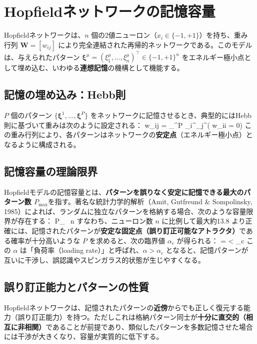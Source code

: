\section{Hopfieldネットワークの記憶容量}
Hopfieldネットワークは、$n$ 個の2値ニューロン（$x_i \in \{-1, +1\}$）を持ち、重み行列 $\mathbf{W} = [w_{ij}]$ により完全連結された再帰的ネットワークである。このモデルは、与えられたパターン $\boldsymbol{\xi}^\mu = (\xi_1^\mu, \ldots, \xi_n^\mu)^\top \in \{-1, +1\}^n$ をエネルギー極小点として埋め込む、いわゆる\textbf{連想記憶}の機構として機能する。
\subsection{記憶の埋め込み：Hebb則}
$P$ 個のパターン $\{ \boldsymbol{\xi}^1, \dots, \boldsymbol{\xi}^P \}$ をネットワークに記憶させるとき、典型的にはHebb則に基づいて重みは次のように設定される：
w_{ij} =  \sum_{}^P \xi_i^\mu \xi_j^\mu \quad ( w_{ii} = 0)
この重み行列により、各パターンはネットワークの\textbf{安定点}（エネルギー極小点）となるように構成される。
\subsection{記憶容量の理論限界}
Hopfieldモデルの記憶容量とは、\textbf{パターンを誤りなく安定に記憶できる最大のパターン数 $P_{\max}$}を指す。著名な統計力学的解析（Amit, Gutfreund & Sompolinsky, 1985）によれば、ランダムに独立なパターンを格納する場合、次のような容量限界が存在する：
P_{\max}  \, n
すなわち、ニューロン数 $n$ に比例して最大約13.8%
より正確には、記憶されたパターンが\textbf{安定な固定点（誤り訂正可能なアトラクタ）}である確率が十分高いような $P$ を求めると、次の臨界値 $\alpha_c$ が得られる：
\alpha =  < \alpha_c 
この $\alpha$ は「負荷率（loading rate）」と呼ばれ、$\alpha > \alpha_c$ となると、記憶パターンが互いに干渉し、誤認識やスピンガラス的状態が生じやすくなる。
\subsection{誤り訂正能力とパターンの性質}
Hopfieldネットワークは、記憶されたパターンの\textbf{近傍}からでも正しく復元する能力（誤り訂正能力）を持つ。ただしこれは格納パターン同士が\textbf{十分に直交的（相互に非相関）}であることが前提であり、類似したパターンを多数記憶させた場合には干渉が大きくなり、容量が実質的に低下する。
